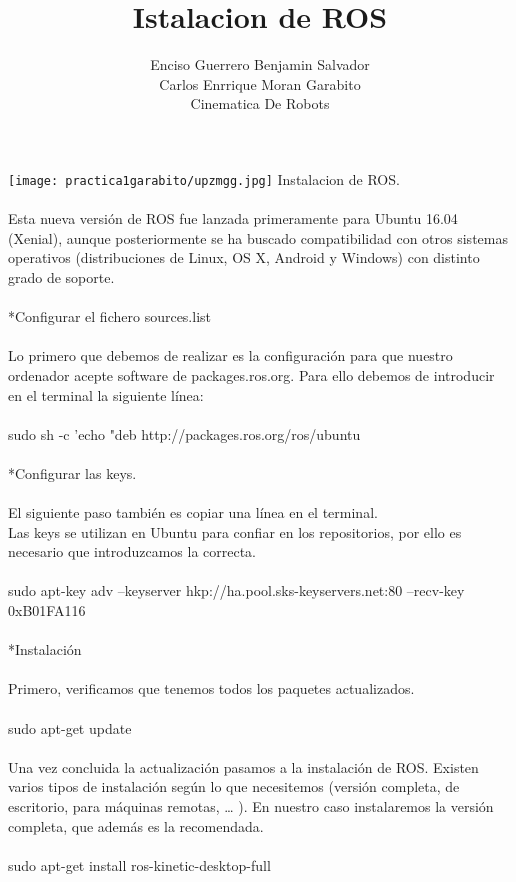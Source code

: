 \documentclass[12pt,a4paper]{article}
\author{Enciso Guerrero Benjamin Salvador\\
Carlos Enrrique Moran Garabito\\
Cinematica De Robots }
\title{Istalacion de ROS}
\begin{document}
\maketitle
\texttt{[image: practica1garabito/upzmgg.jpg]} 
\newpage
Instalacion de ROS.\\\\
Esta nueva versión de ROS fue lanzada primeramente para Ubuntu 16.04 (Xenial), aunque posteriormente se ha buscado compatibilidad con otros sistemas operativos (distribuciones de Linux, OS X, Android y Windows) con distinto grado de soporte.
\\\\
*Configurar el fichero sources.list
\\\\
Lo primero que debemos de realizar es la configuración para que nuestro ordenador acepte software de packages.ros.org. Para ello debemos de introducir en el terminal la siguiente línea:
\\\\
sudo sh -c 'echo "deb http://packages.ros.org/ros/ubuntu
\\\\
*Configurar las keys.
\\\\
El siguiente paso también es copiar una línea en el terminal.\\
Las keys se utilizan en Ubuntu para confiar en los repositorios, por ello es necesario que introduzcamos la correcta.
\\\\
sudo apt-key adv --keyserver hkp://ha.pool.sks-keyservers.net:80 --recv-key 0xB01FA116
\\\\
*Instalación
\\\\
Primero, verificamos que tenemos todos los paquetes actualizados.
\\\\
sudo apt-get update
\\\\
Una vez concluida la actualización pasamos a la instalación de ROS. Existen varios tipos de instalación según lo que necesitemos (versión completa, de escritorio, para máquinas remotas, … ). En nuestro caso instalaremos la versión completa, que además es la recomendada.
\\\\
sudo apt-get install ros-kinetic-desktop-full
\\\\
\end{document}
